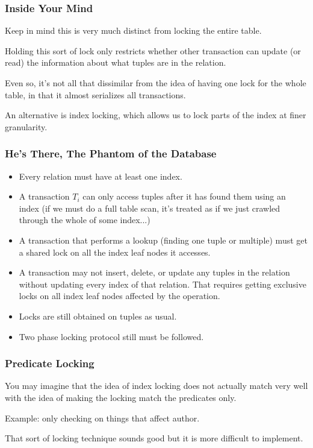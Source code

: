 \begin{frame}
\frametitle{Inside Your Mind}

Keep in mind this is very much distinct from locking the entire table. 

Holding this sort of lock only restricts whether other transaction can update (or read) the information about what tuples are in the relation. 

Even so, it's not all that dissimilar from the idea of having one lock for the whole table, in that it almost serializes all transactions.

An alternative is \alert{index locking}, which allows us to lock parts of the index at finer granularity.

\end{frame}



\begin{frame}
\frametitle{He's There, The Phantom of the Database}

\begin{itemize}
	\item Every relation must have at least one index.
	\item A transaction $T_{i}$ can only access tuples after it has found them using an index (if we must do a full table scan, it's treated as if we just crawled through the whole of some index...)
	\item A transaction that performs a lookup (finding one tuple or multiple) must get a shared lock on all the index leaf nodes it accesses.
	\item A transaction may not insert, delete, or update any tuples in the relation without updating every index of that relation. That requires getting exclusive locks on all index leaf nodes affected by the operation. 
	\item Locks are still obtained on tuples as usual.
	\item Two phase locking protocol still must be followed. 
\end{itemize}


\end{frame}

\begin{frame}
\frametitle{Predicate Locking}
You may imagine that the idea of index locking does not actually match very well with the idea of making the locking match the predicates only.

Example: only checking on things that affect author. 

That sort of locking technique sounds good but it is more difficult to implement. 

\end{frame}

